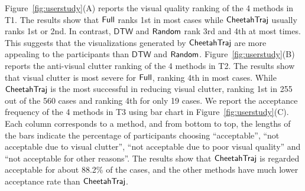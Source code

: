 Figure~\ref{fig:userstudy}(A) reports the visual quality ranking of the 4 methods in T1. The results show that $\mathsf{Full}$ ranks 1st in most cases while $\mathsf{CheetahTraj}$ usually ranks 1st or 2nd. 
In contrast, $\mathsf{DTW}$ and $\mathsf{Random}$ rank 3rd and 4th at most times. 
This suggests that the visualizations generated by $\mathsf{CheetahTraj}$ are more appealing to the participants than $\mathsf{DTW}$ and $\mathsf{Random}$. Figure~\ref{fig:userstudy}(B) reports the anti-visual clutter ranking of the 4 methods in T2. 
The results show that visual clutter is most severe for $\mathsf{Full}$, ranking 4th in most cases.    
While $\mathsf{CheetahTraj}$ is the most successful in reducing visual clutter, ranking 1st in 255 out of the 560 cases and ranking 4th for only 19 cases.
We report the acceptance frequency of the 4 methods in T3 using bar chart in Figure~\ref{fig:userstudy}(C). 
Each column corresponds to a method, and from bottom to top, the lengths of the bars indicate the percentage of participants choosing ``acceptable'', ``not acceptable due to visual clutter'', ``not acceptable due to poor visual quality'' and ``not acceptable for other reasons''. 
The results show that $\mathsf{CheetahTraj}$ is regarded acceptable for about 88.2\% of the cases, and the other methods have much lower acceptance rate than $\mathsf{CheetahTraj}$.   



